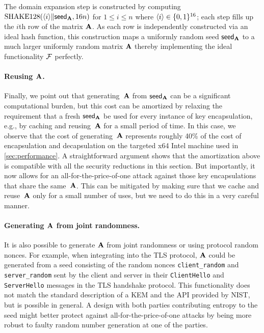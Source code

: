 \documentclass{iacrcc}
\begin{document}
The domain expansion step is constructed
by computing $\textrm{\upshape\mdseries SHAKE}128(\langle i\rangle \| {\mathsf{seed}_{\mathbf{A}}}, 16n)$ for $1 \leq i \leq n$
where $\langle i\rangle \in \{0,1\}^{16}$; each step fills up the $i$th row of the matrix $\mathbf{A}$. As each row is
independently constructed via an ideal hash function, this construction maps
a uniformly random seed ${\mathsf{seed}_{\mathbf{A}}}$ to a much larger uniformly random matrix $\mathbf{A}$
thereby implementing the ideal functionality $\mathcal{F}$ perfectly.

\paragraph{Reusing $\mathbf{A}$.}

Finally, we point out that generating~$\mathbf{A}$ from
${\mathsf{seed}_{\mathbf{A}}}$ can be a significant computational burden, but this
cost can be amortized by relaxing the requirement that a fresh
${\mathsf{seed}_{\mathbf{A}}}$ be used for every instance of key encapsulation, e.g., by
caching and reusing~$\mathbf{A}$ for a small period of time. In this case,
we observe that the cost of generating~$\mathbf{A}$ represents roughly 40\% of the cost
of encapsulation and decapsulation on the targeted x64 Intel machine used in 
\autoref{sec:performance}. 
A straightforward argument shows that the amortization above is compatible with all the security
reductions in this section.  But importantly, it now allows for an
all-for-the-price-of-one attack against those key encapsulations that share
the same~$\mathbf{A}$. This can be mitigated by making sure that we cache and
reuse~$\mathbf{A}$ only for a small number of uses, but we need to do this
in a very careful manner.

\paragraph{Generating $\mathbf{A}$ from joint randomness.}
It is also possible to generate $\mathbf{A}$ from joint randomness or using protocol
random nonces.  For example, when integrating \FrodoKEM into the TLS protocol,
$\mathbf{A}$ could be generated from a seed consisting of the random nonces \texttt{client\_random}
and \texttt{server\_random} sent by the client and server in their
\texttt{ClientHello} and \texttt{ServerHello} messages in the TLS handshake protocol.  
This functionality does not match the standard
description of a KEM and the API provided by NIST, but is possible in general.
A design with both parties contributing entropy to the seed might better
protect against all-for-the-price-of-one attacks by being more robust to
faulty
random number generation at one of the parties.
\end{document}
